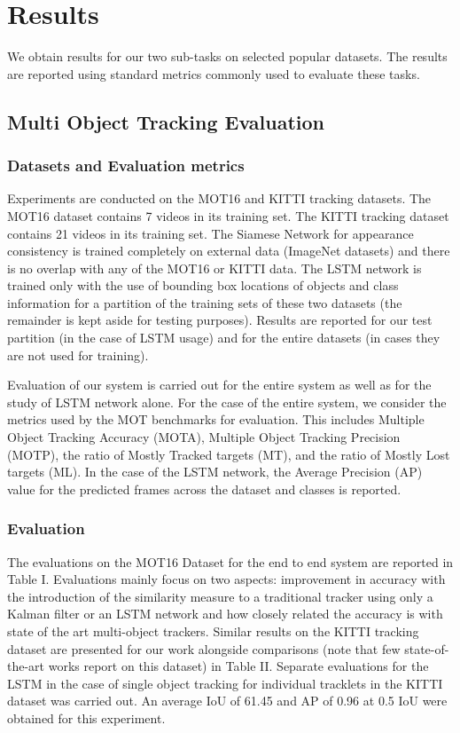 \chapter{Results}
\label{chapter:results}

We obtain results for our two sub-tasks on selected popular datasets. The results are reported using standard metrics commonly used to evaluate these tasks. 


\section{Multi Object Tracking Evaluation}

\subsection{Datasets and Evaluation metrics}
Experiments are conducted on the MOT16 \cite{DeepSiam:MilanL0RS16} and KITTI \cite{DeepSiam:KITTI} tracking datasets. The MOT16 dataset contains 7 videos in its training set. The KITTI tracking dataset contains 21 videos in its training set. The Siamese Network for appearance consistency is trained completely on external data (ImageNet datasets) and there is no overlap with any of the MOT16 or KITTI data. The LSTM network is trained only with the use of bounding box locations of objects and class information for a partition of the training sets of these two datasets (the remainder is kept aside for testing purposes). Results are reported for our test partition (in the case of LSTM usage) and for the entire datasets (in cases they are not used for training).
\par Evaluation of our system is carried out for the entire system as well as for the study of LSTM network alone. For the case of the entire system, we consider the metrics used by the MOT benchmarks for evaluation. This includes Multiple Object Tracking Accuracy (MOTA), Multiple Object Tracking Precision (MOTP), the ratio of Mostly Tracked targets (MT), and the ratio of Mostly Lost targets (ML). In the case of the LSTM network, the Average Precision (AP) value for the predicted frames across the dataset and classes is reported.

\subsection{Evaluation}
The evaluations on the MOT16 Dataset for the end to end system are reported in Table I. Evaluations mainly focus on two aspects: improvement in accuracy with the introduction of the similarity measure to a traditional tracker using only a Kalman filter or an LSTM network and how closely related the accuracy is with state of the art multi-object trackers. Similar results on the KITTI tracking dataset are presented for our work alongside comparisons (note that few state-of-the-art works report on this dataset) in Table II. Separate evaluations for the LSTM in the case of single object tracking for individual tracklets in the KITTI dataset was carried out. An average IoU of 61.45 and AP of 0.96 at 0.5 IoU were obtained for this experiment.

